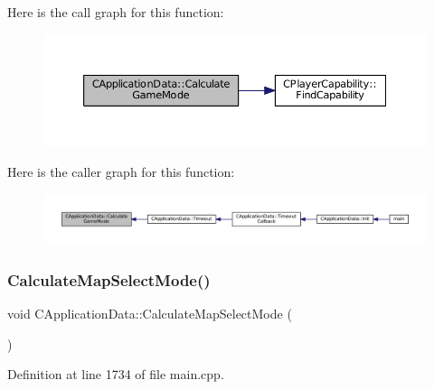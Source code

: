 Here is the call graph for this function\+:\nopagebreak
\begin{figure}[H]
\begin{center}
\leavevmode
\includegraphics[width=350pt]{classCApplicationData_a782d7204356ef9560deedd54320d4f16_cgraph}
\end{center}
\end{figure}
Here is the caller graph for this function\+:\nopagebreak
\begin{figure}[H]
\begin{center}
\leavevmode
\includegraphics[width=350pt]{classCApplicationData_a782d7204356ef9560deedd54320d4f16_icgraph}
\end{center}
\end{figure}
\hypertarget{classCApplicationData_a3c481d6483d165488596144a4bcf95cf}{}\label{classCApplicationData_a3c481d6483d165488596144a4bcf95cf} 
\subsubsection{\texorpdfstring{Calculate\+Map\+Select\+Mode()}{CalculateMapSelectMode()}}
{\footnotesize\ttfamily void C\+Application\+Data\+::\+Calculate\+Map\+Select\+Mode (\begin{DoxyParamCaption}{ }\end{DoxyParamCaption})\hspace{0.3cm}{\ttfamily [protected]}}



Definition at line 1734 of file main.\+cpp.



